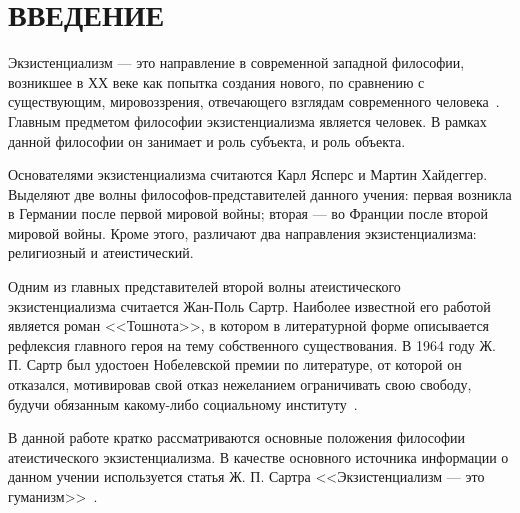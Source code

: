 \section*{ВВЕДЕНИЕ}

Экзистенциализм --- это направление в современной западной философии,
возникшее в ХХ веке как попытка создания нового, по сравнению с существующим,
мировоззрения, отвечающего взглядам современного человека~\cite{solecity_exist}.
Главным предметом философии экзистенциализма является человек.
В рамках данной философии он занимает и роль субъекта, и роль объекта.

Основателями экзистенциализма считаются Карл Ясперс и Мартин Хайдеггер.
Выделяют две волны философов-представителей данного учения:
первая возникла в Германии после первой мировой войны;
вторая --- во Франции после второй мировой войны.
Кроме этого, различают два направления экзистенциализма: религиозный и атеистический.

Одним из главных представителей второй волны атеистического экзистенциализма
считается Жан-Поль Сартр. Наиболее известной его работой является роман <<Тошнота>>,
в котором в литературной форме описывается рефлексия главного героя
на тему собственного существования.
В 1964 году Ж. П. Сартр был удостоен Нобелевской премии по литературе,
от которой он отказался, мотивировав свой отказ нежеланием ограничивать свою свободу,
будучи обязанным какому-либо социальному институту~\cite{sartr_nobel}.

В данной работе кратко рассматриваются основные положения философии атеистического
экзистенциализма. В качестве основного источника информации о данном учении используется
статья Ж. П. Сартра <<Экзистенциализм --- это гуманизм>>~\cite{sartr_exist_human}.
